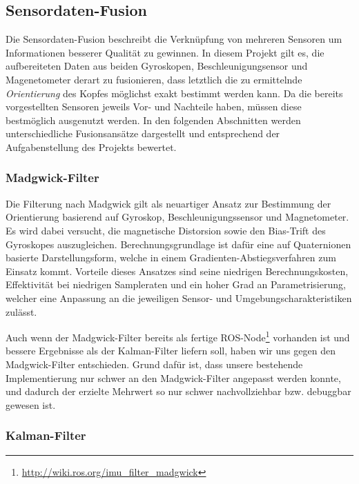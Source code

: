 
\subsection{Sensordaten-Fusion}
\label{headtracking_fusion_subsec}


Die Sensordaten-Fusion beschreibt die Verknüpfung von mehreren Sensoren um Informationen besserer Qualität zu gewinnen.
In diesem Projekt gilt es, die aufbereiteten Daten aus beiden Gyroskopen, Beschleunigungsensor und Magenetometer derart zu fusionieren, dass letztlich die zu ermittelnde \emph{Orientierung} des Kopfes möglichst exakt bestimmt werden kann.
Da die bereits vorgestellten Sensoren jeweils Vor- und Nachteile haben, müssen diese bestmöglich ausgenutzt werden.
In den folgenden Abschnitten werden unterschiedliche Fusionsansätze dargestellt und entsprechend der Aufgabenstellung des Projekts bewertet. 


\subsubsection{Madgwick-Filter}

Die Filterung nach Madgwick \cite{madgwick2010efficient} gilt als neuartiger Ansatz zur Bestimmung der Orientierung basierend auf Gyroskop, Beschleunigungssensor und Magnetometer.
Es wird dabei versucht, die magnetische Distorsion sowie den Bias-Trift des Gyroskopes auszugleichen.
Berechnungsgrundlage ist dafür eine auf Quaternionen basierte Darstellungsform, welche in einem Gradienten-Abstiegsverfahren zum Einsatz kommt.
Vorteile dieses Ansatzes sind seine niedrigen Berechnungskosten, Effektivität bei niedrigen Sampleraten und ein hoher Grad an Parametrisierung, welcher eine Anpassung an die jeweiligen Sensor- und Umgebungscharakteristiken zulässt.

Auch wenn der Madgwick-Filter bereits als fertige ROS-Node\footnote{\url{http://wiki.ros.org/imu_filter_madgwick}} vorhanden ist und bessere Ergebnisse als der Kalman-Filter liefern soll, haben wir uns gegen den Madgwick-Filter entschieden.
Grund dafür ist, dass unsere bestehende Implementierung nur schwer an den Madgwick-Filter angepasst werden konnte, und dadurch der erzielte Mehrwert so nur schwer nachvollziehbar bzw. debuggbar gewesen ist. 



\subsubsection{Kalman-Filter}


